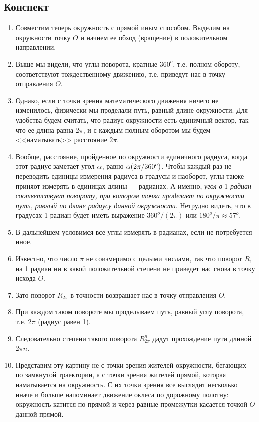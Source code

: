 \subsection{Конспект}
\begin{enumerate}\setlength{\itemsep}{1pt}
\item Совместим теперь окружность с прямой иным способом. Выделим на окружности точку $O$ и начнем ее обход (вращение) в положительном направлении.
\item Выше мы видели, что углы поворота, кратные $360^o$, т.е. полном обороту, соответствуют тождественному движению, т.е. приведут нас в точку отправления $O$.
\item Однако, если с точки зрения математического движения ничего не изменилось, физически мы проделали путь, равный длине окружности. Для удобства будем считать, что радиус окружности есть единичный вектор, так что ее длина равна $2\pi$, и с каждым полным оборотом мы будем <<наматывать>> расстояние $2\pi$.
\item Вообще, расстояние, пройденное по окружности единичного радиуса, когда этот радиус заметает угол $\alpha$, равно $\alpha(2\pi/360^o)$. Чтобы каждый раз не переводить единицы измерения радиуса в градусы и наоборот, углы также приняот измерять в единицах длины --- радианах. А именно, \textit{угол в} 1 \textit{радиан соответствует повороту, при котором точка проделает по окружности путь, равный по длине радиусу данной окружности}. Нетрудно видеть, что в градусах 1 радиан будет иметь выражение $360^o/(2\pi)$ или $180^o/\pi \approx 57^o$.
\item В дальнейшем условимся все углы измерять в радианах, если не потребуется иное.
\item Известно, что число $\pi$ не соизмеримо с целыми числами, так что поворот $R_1$ на 1 радиан ни в какой положительной степени не приведет нас снова в точку исхода $O$.
\item Зато поворот $R_{2\pi}$ в точности возвращает нас в точку отправления $O$.
\item При каждом таком повороте мы проделываем путь, равный углу поворота, т.е. $2\pi$ (радиус равен 1).
\item Следовательно степени такого поворота $R_{2\pi}^n$ дадут прохождение пути длиной $2\pi n$.
\item Представим эту картину не с точки зрения жителей окружности, бегающих по замкнутой траектории, а с точки зрения жителей прямой, которая наматывается на окружность. С их точки зрения все выглядит несколько иначе и больше напоминает движение оклеса по дорожному полотну: окружность катится по прямой и через равные промежутки касается точкой $O$ данной прямой.

\end{enumerate}
